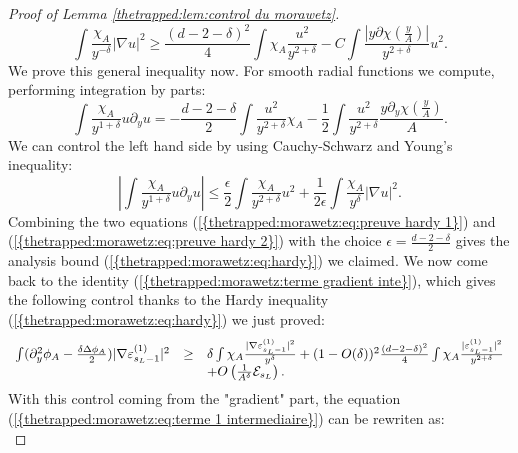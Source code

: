 \documentclass[11pt,a4paper,reqno]{amsart}
\theoremstyle{remark}
\numberwithin{equation}{section}
\begin{document}
\begin{proof}[Proof of Lemma \ref{thetrapped:lem:control du morawetz}]
\begin{equation} \label{thetrapped:morawetz:eq:hardy}
\int \frac{\chi_A}{y^{-\delta}}|\nabla u|^2 \geq \frac{(d-2-\delta)^2}{4}\int \chi_A\frac{u^2}{y^{2+\delta}}-C\int \frac{|y\partial \chi (\frac{y}{A})|}{y^{2+\delta}}u^2 .
\end{equation}
We prove this general inequality now. For smooth radial functions we compute, performing integration by parts:
\begin{equation} \label{thetrapped:morawetz:eq:preuve hardy 1}
\int \frac{\chi_A}{y^{1+\delta}}u\partial_y u = -\frac{d-2-\delta}{2} \int \frac{u^2}{y^{2+\delta}}\chi_A -\frac{1}{2}\int \frac{u^2}{y^{2+\delta}}\frac{y\partial_y\chi (\frac{y}{A})}{A} .
\end{equation}
We can control the left hand side by using Cauchy-Schwarz and Young's inequality:
\begin{equation} \label{thetrapped:morawetz:eq:preuve hardy 2}
\left| \int \frac{\chi_A}{y^{1+\delta}}u\partial_y u \right|\leq \frac{\epsilon}{2} \int \frac{\chi_A}{y^{2+\delta}}u^2 +\frac{1}{2\epsilon}\int \frac{\chi_A}{y^{\delta}}|\nabla u|^2 .
\end{equation}
Combining the two equations {{\rm (\ref{{thetrapped:morawetz:eq:preuve hardy 1}})}} and {{\rm (\ref{{thetrapped:morawetz:eq:preuve hardy 2}})}} with the choice $\epsilon=\frac{d-2-\delta}{2}$ gives the analysis bound {{\rm (\ref{{thetrapped:morawetz:eq:hardy}})}} we claimed. We now come back to the identity {{\rm (\ref{{thetrapped:morawetz:terme gradient inte}})}}, which gives the following control thanks to the Hardy inequality {{\rm (\ref{{thetrapped:morawetz:eq:hardy}})}} we just proved:
\begin{equation} \label{thetrapped:morawetz:terme gradient}
\begin{array}{r c l}
\int (\partial_y^2 \phi_A -\frac{\delta \Delta \phi_A}{2} )|\nabla \varepsilon^{(1)}_{s_L-1}|^2&\geq& \delta \int \chi_A \frac{|\nabla \varepsilon^{(1)}_{s_L-1}|^2}{y^{\delta}}+(1-O(\delta))^2\frac{(d-2-\delta)^2}{4} \int \chi_A \frac{|\varepsilon^{(1)}_{s_L-1}|^2}{y^{2+\delta}} \\
&&+O\left( \frac{1}{A^{\delta}}\mathcal{E}_{s_L} \right).
\end{array}
\end{equation}
With this control coming from the "gradient" part, the equation {{\rm (\ref{{thetrapped:morawetz:eq:terme 1 intermediaire}})}} can be rewriten as:
\begin{equation} \label{thetrapped:morawetz:eq:terme 1 intermediaire 2}

\end{equation}
\end{proof}
\end{document}
